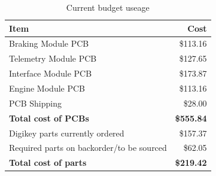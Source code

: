 \documentclass[12pt]{report}
\begin{document}
    \begin{table}[H]
      \begin{centering}
	\caption{Current budget useage}\label{tab:budget}
	\begin{tabular}{|l|r|}
	  \hline 
	  \textbf{Item} & \textbf{Cost}\tabularnewline
	  \hline
	  \hline 
	  Braking Module PCB & \$113.16\tabularnewline
	  \hline 
	  Telemetry Module PCB & \$127.65\tabularnewline
	  \hline 
	  Interface Module PCB & \$173.87\tabularnewline
	  \hline 
	  Engine Module PCB & \$113.16\tabularnewline
	  \hline 
	  PCB Shipping & \$28.00\tabularnewline
	  \hline
	  \hline 
	  \textbf{Total cost of PCBs} & \textbf{\$555.84}\tabularnewline
	  \hline
	  \hline 
	  Digikey parts currently ordered & \$157.37\tabularnewline
	  \hline 
	  Required parts on backorder/to be sourced & \$62.05\tabularnewline
	  \hline
	  \hline 
	  \textbf{Total cost of parts} & \textbf{\$219.42}\tabularnewline
	  \hline
	\end{tabular}
	\par
      \end{centering}
    \end{table}

\pagebreak
\end{document}
